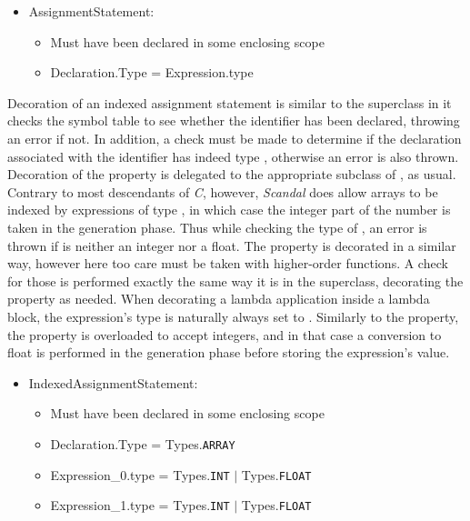 \begin{itemize}
	\item AssignmentStatement:
		\begin{itemize}
			\item Must have been declared in some enclosing scope
			\item Declaration.Type = Expression.type
		\end{itemize}
\end{itemize}

Decoration of an indexed assignment statement is similar to the superclass in it checks the symbol table to see whether the identifier has been declared, throwing an error if not. In addition, a check must be made to determine if the declaration associated with the identifier has indeed type , otherwise an error is also thrown. Decoration of the  property is delegated to the appropriate subclass of , as usual. Contrary to most descendants of \emph{C}, however, \emph{Scandal} does allow arrays to be indexed by expressions of type , in which case the integer part of the number is taken in the generation phase. Thus while checking the type of , an error is thrown if is neither an integer nor a float. The  property is decorated in a similar way, however here too care must be taken with higher-order functions. A check for those is performed exactly the same way it is in the superclass, decorating the  property as needed. When decorating a lambda application inside a lambda block, the expression's type is naturally always set to . Similarly to the  property, the  property is overloaded to accept integers, and in that case a conversion to float is performed in the generation phase before storing the expression's value.

\begin{itemize}
	\item IndexedAssignmentStatement:
		\begin{itemize}
			\item Must have been declared in some enclosing scope
			\item Declaration.Type = Types.\texttt{ARRAY}
			\item Expression\_0.type = Types.\texttt{INT} $|$ Types.\texttt{FLOAT}
			\item Expression\_1.type = Types.\texttt{INT} $|$ Types.\texttt{FLOAT}
		\end{itemize}
\end{itemize}

